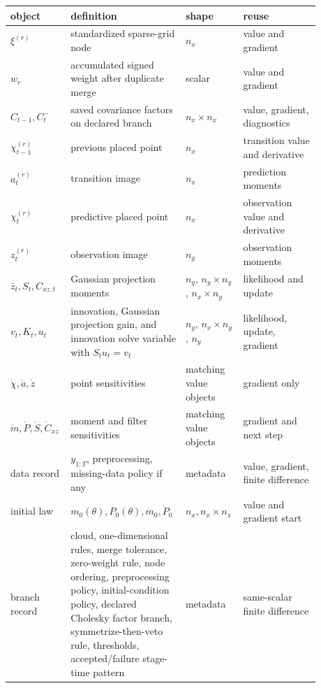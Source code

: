 \documentclass[11pt]{article}
\numberwithin{equation}{section}
\begin{document}
\begin{center}
\small
\begin{tabular}{p{0.18\linewidth}p{0.30\linewidth}p{0.16\linewidth}p{0.24\linewidth}}
\toprule
object & definition & shape & reuse \\
\midrule
\(\xi^{(r)}\) & standardized sparse-grid node & \(n_x\) & value and gradient \\
\(w_r\) & accumulated signed weight after duplicate merge & scalar & value and gradient \\
\(C_{t-1},C_t^-\) & saved covariance factors on declared branch & \(n_x\times n_x\) & value, gradient, diagnostics \\
\(\chi_{t-1}^{(r)}\) & previous placed point & \(n_x\) & transition value and derivative \\
\(a_t^{(r)}\) & transition image & \(n_x\) & prediction moments \\
\(\chi_t^{(r)}\) & predictive placed point & \(n_x\) & observation value and derivative \\
\(z_t^{(r)}\) & observation image & \(n_y\) & observation moments \\
\(\bar z_t,S_t,C_{xz,t}\) & Gaussian projection moments & \(n_y\), \(n_y\times n_y\), \(n_x\times n_y\) & likelihood and update \\
\(v_t,K_t,u_t\) & innovation, Gaussian projection gain, and innovation solve variable with \(S_tu_t=v_t\) & \(n_y\), \(n_x\times n_y\), \(n_y\) & likelihood, update, gradient \\
\(\dot \chi,\dot a,\dot z\) & point sensitivities & matching value objects & gradient only \\
\(\dot m,\dot P,\dot S,\dot C_{xz}\) & moment and filter sensitivities & matching value objects & gradient and next step \\
data record & \(y_{1:T}\), preprocessing, missing-data policy if any & metadata & value, gradient, finite difference \\
initial law & \(m_0(\theta),P_0(\theta),\dot m_0,\dot P_0\) & \(n_x,n_x\times n_x\) & value and gradient start \\
branch record & cloud, one-dimensional rules, merge tolerance, zero-weight rule, node ordering, preprocessing policy, initial-condition policy, declared Cholesky factor branch, symmetrize-then-veto rule, thresholds, accepted/failure stage-time pattern & metadata & same-scalar finite difference \\
\bottomrule
\end{tabular}
\end{center}
\end{document}
